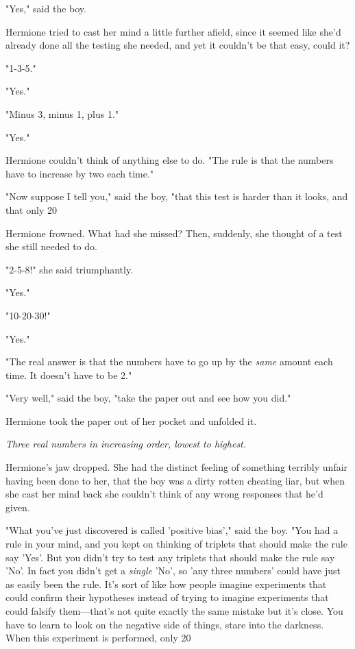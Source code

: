 "Yes," said the boy.

Hermione tried to cast her mind a little further afield, since it seemed like she'd already done all the testing she needed, and yet it couldn't be that easy, could it?

"1-3-5."

"Yes."

"Minus 3, minus 1, plus 1."

"Yes."

Hermione couldn't think of anything else to do. "The rule is that the numbers have to increase by two each time."

"Now suppose I tell you," said the boy, "that this test is harder than it looks, and that only 20%

Hermione frowned. What had she missed? Then, suddenly, she thought of a test she still needed to do.

"2-5-8!" she said triumphantly.

"Yes."

"10-20-30!"

"Yes."

"The real answer is that the numbers have to go up by the \emph{same} amount each time. It doesn't have to be 2."

"Very well," said the boy, "take the paper out and see how you did."

Hermione took the paper out of her pocket and unfolded it.

\emph{Three real numbers in increasing order, lowest to highest.}

Hermione's jaw dropped. She had the distinct feeling of something terribly unfair having been done to her, that the boy was a dirty rotten cheating liar, but when she cast her mind back she couldn't think of any wrong responses that he'd given.

"What you've just discovered is called 'positive bias'," said the boy. "You had a rule in your mind, and you kept on thinking of triplets that should make the rule say 'Yes'. But you didn't try to test any triplets that should make the rule say 'No'. In fact you didn't get a \emph{single} 'No', so 'any three numbers' could have just as easily been the rule. It's sort of like how people imagine experiments that could confirm their hypotheses instead of trying to imagine experiments that could falsify them---that's not quite exactly the same mistake but it's close. You have to learn to look on the negative side of things, stare into the darkness. When this experiment is performed, only 20%


